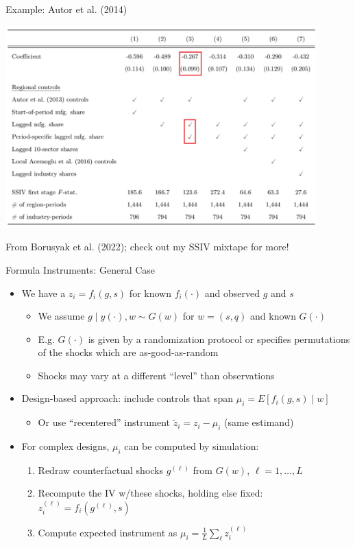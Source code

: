 \documentclass[11pt,english]{beamer}
\begin{document}
\begin{frame}{Example: Autor et al. (2014)}

\begin{center}
	\includegraphics[width=0.9\textwidth]{figures/adh_bhj.png}
\end{center}

From Borusyak et al. (2022); check out my SSIV mixtape for more!


\end{frame}

\begin{frame}{Formula Instruments: General Case}
\begin{itemize}
\item We have a $z_i=f_i(g,s)$ for known $f_i(\cdot)$ and observed $g$ and $s$\smallskip
\begin{itemize}
\item We assume $g\mid y(\cdot),w\sim G(w)$ for $w=(s,q)$ and known $G(\cdot)$\smallskip\pause{}
\item E.g. $G(\cdot)$ is given by a randomization protocol or specifies permutations of the shocks which are as-good-as-random\smallskip\pause{}
\item Shocks may vary at a different ``level'' than observations
\end{itemize}\bigskip\pause{}
\item Design-based approach: include controls that span $\mu_i=E[f_i(g,s)\mid w]$\smallskip\pause{}
\begin{itemize}
\item Or use ``recentered'' instrument $\tilde{z}_i=z_i-\mu_i$ (same estimand)
\end{itemize}\bigskip\pause{}
\item For complex designs, $\mu_i$ can be computed by simulation:\smallskip
\begin{enumerate}
\item Redraw counterfactual shocks $g^{(\ell)}$ from $G(w)$, $\ell=1,\dots,L$ \smallskip\pause{}
\item Recompute the IV w/these shocks, holding else fixed: $z_i^{(\ell)}=f_i(g^{(\ell)},s)$\smallskip\pause{}
\item Compute expected instrument as $\mu_i=\frac{1}{L}\sum_\ell z_i^{(\ell)}$
\end{enumerate}
\end{itemize}
\end{frame}
\end{document}
